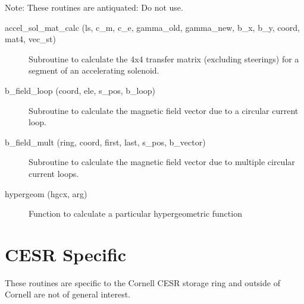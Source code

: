 Note: These routines are antiquated: Do not use.

\begin{description}

\item[accel\_sol\_mat\_calc (ls, c\_m, c\_e, gamma\_old, gamma\_new, 
b\_x, b\_y, coord, mat4, vec\_st)] \Newline
Subroutine to calculate the 4x4 transfer matrix (excluding steerings) for a 
segment of an accelerating solenoid. 

\item[b\_field\_loop (coord, ele, s\_pos, b\_loop)] \Newline
Subroutine to calculate the magnetic field vector due to a 
circular current loop. 

\item[b\_field\_mult (ring, coord, first, last, s\_pos, b\_vector)] \Newline
Subroutine to calculate the magnetic field vector due to multiple 
circular current loops. 

\item[hypergeom (hgcx, arg)] \Newline
Function to calculate a particular hypergeometric function 

\end{description}

%

\section{CESR Specific}
\label{r:cesr}

These routines are specific to the Cornell CESR storage ring and
outside of Cornell are not of general interest.

